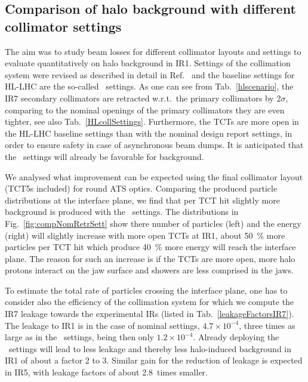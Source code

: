 \subsection{Comparison of halo background with different collimator settings}

The aim was to study beam losses for different collimator layouts and settings to evaluate quantitatively on halo background in IR1. Settings of the collimation system were revised as described in detail in Ref.~\cite{collSettRef} and the baseline settings for HL-LHC are the so-called \twosigmaret~settings. As one can see from Tab.~\ref{hlscenario}, the IR7 secondary collimators are retracted w.r.t.~the primary collimators by 2$\sigma$, comparing to the nominal openings of the primary collimators they are even tighter, see also Tab.~\ref{HLcollSettings}. Furthermore, the TCTs are more open in the HL-LHC baseline settings than with the nominal design report settings, in order to ensure safety in case of asynchronous beam dumps. It is anticipated that the \twosigmaret~settings will already be favorable for background.

We analysed what improvement can be expected using the final collimator layout (TCT5s included) for round ATS optics. Comparing the produced particle distributions at the interface plane, we find that per TCT hit slightly more background is produced with the \twosigmaret~settings. The distributions in Fig.~\ref{fig:compNomRetrSett} show there number of particles (left) and the energy (right) will slightly increase with more open TCTs at IR1, about 50~\% more particles per TCT hit which produce 40~\% more energy will reach the interface plane. The reason for such an increase is if the TCTs are more open, more halo protons interact on the jaw surface and showers are less comprised in the jaws. %

To estimate the total rate of particles crossing the interface plane, one has to consider also the efficiency of the collimation system for which we compute the IR7 leakage towards the experimental IRs (listed in Tab.~\ref{leakageFactorsIR7}). The leakage to IR1 is in the case of nominal settings, $4.7 \times 10^{-4}$, three times as large as in the \twosigmaret~settings, being then only $1.2 \times 10^{-4}$. Already deploying the \twosigmaret~settings will lead to less leakage and thereby less halo-induced background in IR1 of about a factor 2 to 3. Similar gain for the reduction of leakage is expected in IR5, with leakage factors of about 2.8~times smaller.



